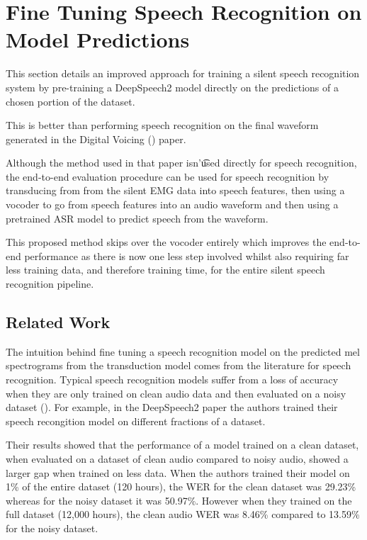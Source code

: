 \section{Fine Tuning Speech Recognition on Model Predictions}

This section details an improved approach for training a silent speech
recognition system by pre-training a DeepSpeech2 model directly on the
predictions of a chosen portion of the dataset.

This is better than performing
speech recognition on the final waveform generated in the Digital Voicing
(\cite{gaddy2020digital}) paper.

Although the method used in that paper isn'\t
used directly for speech recognition, the end-to-end evaluation procedure
can be used for speech recognition by transducing from from the silent EMG
data into speech features, then using a vocoder to go from speech features
into an audio waveform and then using a pretrained ASR model to predict speech
from the waveform.

This proposed method skips over the vocoder entirely which improves the
end-to-end performance as there is now one less step involved whilst
also requiring far less training data, and therefore training time,
for the entire silent speech recognition pipeline.

\subsection{Related Work}

The intuition behind fine tuning a speech recognition model on the
predicted mel spectrograms from the transduction model comes
from the literature for speech recognition. Typical speech recognition models
suffer from a loss of accuracy when they are only trained on clean audio data
and then evaluated on a noisy dataset (\cite{DS2_original}). For example,
in the DeepSpeech2 paper the authors trained their speech recongition
model on different fractions of a dataset.

Their results showed that the
performance of a model trained on a clean dataset, when evaluated on a dataset
of clean audio compared to noisy audio, showed a larger gap when trained on less
data. When the authors trained their model on 1\% of the entire dataset (120 hours),
the WER for the clean dataset was 29.23\% whereas for the noisy dataset it was 50.97\%.
However when they trained on the full dataset (12,000 hours), the clean audio
WER was 8.46\% compared to 13.59\% for the noisy dataset.

